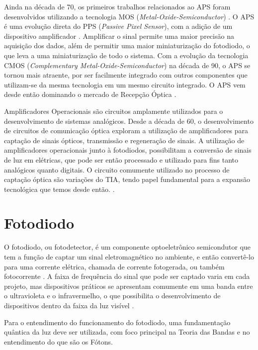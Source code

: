 Ainda na d\'ecada de 70, os primeiros trabalhos relacionados ao APS foram desenvolvidos utilizando a tecnologia MOS (\textit{Metal-Oxide-Semiconductor}) \cite{Peter}. O APS \'e uma evolução direta do PPS (\textit{Passive Pixel Sensor}), com a adição de um dispositivo amplificador \cite{EstevaoCoelho}. Amplificar o sinal permite uma maior precisão na aquisição dos dados, al\'em de permitir uma maior miniaturização do fotodiodo, o que leva a uma miniaturização de todo o sistema. Com a evolução da tecnologia CMOS (\textit{Complementary Metal-Oxide-Semiconductor}) na d\'ecada de 90, o APS se tornou mais atraente, por ser facilmente integrado com outros componentes que utilizam-se da mesma tecnologia em um mesmo circuito integrado. O APS vem desde então dominando o mercado de Recepção Óptica \cite{Andre, LidianeCampos}.

Amplificadores Operacionais são circuitos amplamente utilizados para o desenvolvimento de sistemas analógicos. Desde a década de 60, o desenvolvimento de circuitos de comunicação óptica exploram a utilização de amplificadores para captação de sinais ópticos, transmissão e regeneração de sinais. A utilização de amplificadores operacionais junto à fotodiodos, possibilitam a conversão de sinais de luz em elétricas, que pode ser então processado e utilizado para fins tanto analógicos quanto digitais. O circuito comumente utilizado no processo de captação óptica são variações do TIA, tendo papel fundamental para a expansão tecnológica que temos desde então. \cite{ajoy, andrefontoura}.

\section{Fotodiodo}

O fotodiodo, ou fotodetector, \'e um componente optoeletrônico semicondutor que tem a função de captar um sinal eletromagn\'etico no ambiente, e então convertê-lo para uma corrente el\'etrica, chamada de corrente fotogerada, ou tamb\'em fotocorrente \cite{RazaviOpt}. A faixa de frequência do sinal que pode ser captado varia em cada projeto, mas dispositivos práticos se apresentam comumente em uma banda entre o ultravioleta e o infravermelho, o que possibilita o desenvolvimento de dispositivos dentro da faixa da luz visível \cite{LidianeCampos}.

Para o entendimento do funcionamento do fotodiodo, uma fundamentação quântica da luz deve ser utilizada, com foco principal na Teoria das Bandas e no entendimento do que são os Fótons.

